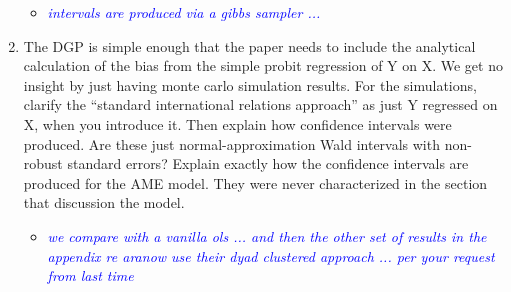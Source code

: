 \begin{enumerate}
	\begin{itemize}
		\item  \emph{ \textcolor{blue}{
		intervals are produced via a gibbs sampler ...
		}}
	\end{itemize}
	\item The DGP is simple enough that the paper needs to include the analytical calculation of the bias from the simple probit regression of Y on X.  We get no insight by just having monte carlo simulation results. For the simulations, clarify the ``standard international relations approach'' as just Y regressed on X, when you introduce it. Then explain how confidence intervals were produced. Are these just normal-approximation Wald intervals with non-robust standard errors? Explain exactly how the confidence intervals are produced for the AME model.  They were never characterized in the section that discussion the model.
	\begin{itemize}
		\item  \emph{ \textcolor{blue}{
		we compare with a vanilla ols ...
		and then the other set of results in the appendix re aranow use their dyad clustered approach ... per your request from last time
		}}
	\end{itemize}
\end{enumerate}
